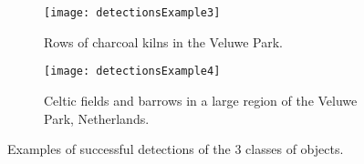 \begin{figure}[ht]
	\begin{subfigure}{\textwidth}
		\centering
		\texttt{[image: detectionsExample3]}  
		\caption{Rows of charcoal kilns in the Veluwe Park.}
		\label{fig:detectionsExample3}
	\end{subfigure}
	\begin{subfigure}{\textwidth}
		\centering
		\texttt{[image: detectionsExample4]}  
		\caption{Celtic fields and barrows in a large region of the Veluwe Park, Netherlands.}
		\label{fig:}
	\end{subfigure}
	\caption{Examples of successful detections of the 3 classes of objects. }
	\label{fig:}
\end{figure}
